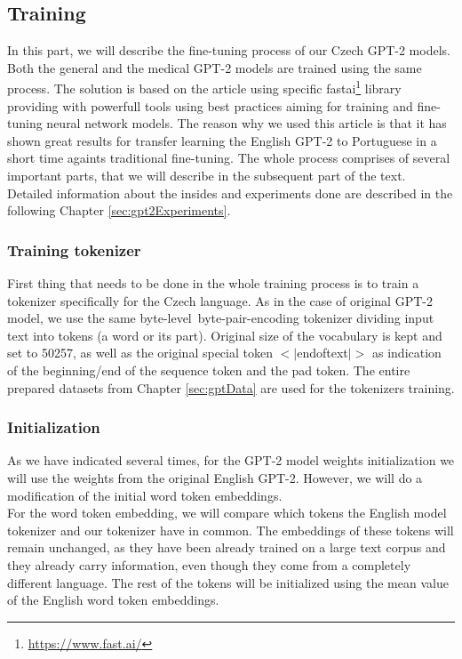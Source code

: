 \subsection{Training}
\label{sec:gpt2Training}
In this part, we will describe the fine-tuning process of our Czech GPT-2 models. Both the general and the medical GPT-2 models are trained using the same process. The solution is based on the \citet{guillou2020faster} article using specific fastai\footnote[8]{\url{https://www.fast.ai/}} library providing with powerfull tools using best practices aiming for training and fine-tuning neural network models. The reason why we used this article is that it has shown great results for transfer learning the English GPT-2 to Portuguese in a short time againts traditional fine-tuning. The whole process comprises of several important parts, that we will describe in the subsequent part of the text. Detailed information about the insides and experiments done are described in the following Chapter \ref{sec:gpt2Experiments}.

\subsubsection*{Training tokenizer}
First thing that needs to be done in the whole training process is to train a tokenizer specifically for the Czech language. As in the case of original GPT-2 model, we use the same byte-level~byte-pair-encoding\citep{sennrich2015neural} tokenizer dividing input text into tokens (a word or its part). Original size of the vocabulary is kept and set to 50257, as well as the original special token $<|$endoftext$|>$ as indication of the beginning/end of the sequence token and the pad token. The entire prepared datasets from Chapter \ref{sec:gptData} are used for the tokenizers training.

\subsubsection*{Initialization}
As we have indicated several times, for the GPT-2 model weights initialization we will use the weights from the original English GPT-2. However, we will do a modification of the initial word token embeddings.\\

For the word token embedding, we will compare which tokens the English model tokenizer and our tokenizer have in common. The embeddings of these tokens will remain unchanged, as they have been already trained on a large text corpus and they already carry information, even though they come from a completely different language. The rest of the tokens will be initialized using the mean value of the English word token embeddings.

